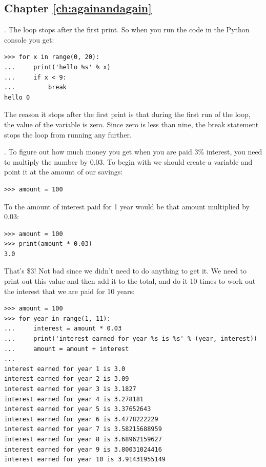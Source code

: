 \subsection*{Chapter \ref{ch:againandagain}}

. The loop stops after the first print.  So when you run the code in the Python console you get:

\begin{listing}
\begin{verbatim}
>>> for x in range(0, 20):
...     print('hello %s' % x)
...     if x < 9:
...         break
hello 0
\end{verbatim}
\end{listing}

\noindent
The reason it stops after the first print is that during the first run of the loop, the value of the variable  is zero.  Since zero is less than nine, the break statement stops the loop from running any further.

. To figure out how much money you get when you are paid 3\% interest, you need to multiply the number by 0.03.  To begin with we should create a variable and point it at the amount of our savings:

\begin{listing}
\begin{verbatim}
>>> amount = 100
\end{verbatim}
\end{listing}

To the amount of interest paid for 1 year would be that amount multiplied by 0.03:

\begin{listing}
\begin{verbatim}
>>> amount = 100
>>> print(amount * 0.03)
3.0
\end{verbatim}
\end{listing}

That's \$3!  Not bad since we didn't need to do anything to get it.  We need to print out this value and then add it to the total, and do it 10 times to work out the interest that we are paid for 10 years:

\begin{listing}
\begin{verbatim}
>>> amount = 100
>>> for year in range(1, 11):
...     interest = amount * 0.03
...     print('interest earned for year %s is %s' % (year, interest))
...     amount = amount + interest
... 
interest earned for year 1 is 3.0
interest earned for year 2 is 3.09
interest earned for year 3 is 3.1827
interest earned for year 4 is 3.278181
interest earned for year 5 is 3.37652643
interest earned for year 6 is 3.4778222229
interest earned for year 7 is 3.58215688959
interest earned for year 8 is 3.68962159627
interest earned for year 9 is 3.80031024416
interest earned for year 10 is 3.91431955149
\end{verbatim}
\end{listing}

